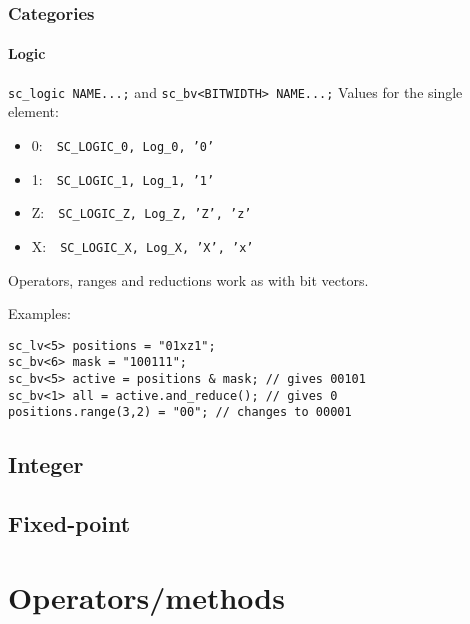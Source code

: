 \begin{frame}[fragile]
\frametitle{Categories}
\framesubtitle{Logic}

{\scriptsize 
\begin{block}{\texttt{sc\_logic NAME...;} and \texttt{sc\_bv<BITWIDTH> NAME...;}}
Values for the single element:
\begin{itemize}
\item 0: \,\, \texttt{SC\_LOGIC\_0, Log\_0, '0'}
\item 1: \,\, \texttt{SC\_LOGIC\_1, Log\_1, '1'}
\item Z: \,\, \texttt{SC\_LOGIC\_Z, Log\_Z, 'Z', 'z'}
\item X: \,\, \texttt{SC\_LOGIC\_X, Log\_X, 'X', 'x'}
\end{itemize}
Operators, ranges and reductions work as with bit vectors.
\end{block}
\pause
\begin{block}{Examples:} 
\vspace{-1em}
\begin{verbatim}
sc_lv<5> positions = "01xz1";
sc_bv<6> mask = "100111";
sc_bv<5> active = positions & mask; // gives 00101
sc_bv<1> all = active.and_reduce(); // gives 0
positions.range(3,2) = "00"; // changes to 00001
\end{verbatim}
\vspace{-1em}
\end{block}
}
\end{frame}

\subsection{Integer}


\subsection{Fixed-point}


\section{Operators/methods}
